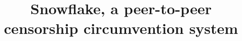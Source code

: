 \documentclass[letterpaper,twocolumn]{article}
\begin{document}
\date{}

\title{Snowflake, a peer-to-peer censorship circumvention system}

\author{}

\maketitle

\begin{abstract}
\end{abstract}

\nocite{arxiv.2008.03254}



\end{document}
